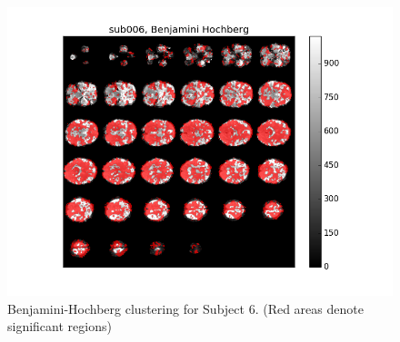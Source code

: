 \begin{figure}[H]
\begin{minipage}[b]{.66\linewidth}
	\centering
		\includegraphics[width=.8\linewidth]{../images/sub006_bh_overlay.png} 
	\caption{Benjamini-Hochberg clustering for Subject 6. 
	(Red areas denote significant regions)}
	\label{fig:clusterBH}
\end{minipage}
\end{figure}


